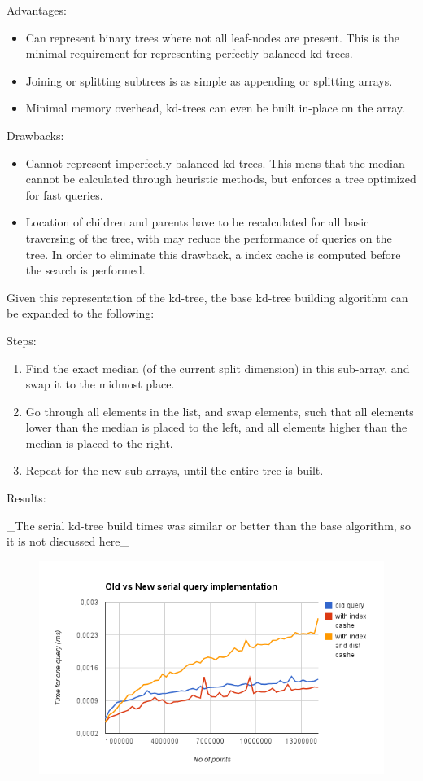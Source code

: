 \begin{enumerate}
\begin{enumerate}
Advantages:
\begin{itemize}
    \item Can represent binary trees where not all leaf-nodes are present. This is the minimal requirement for representing perfectly balanced kd-trees.
    \item Joining or splitting subtrees is as simple as appending or splitting arrays.
    \item Minimal memory overhead, kd-trees can even be built in-place on the array.
\end{itemize}

Drawbacks:
\begin{itemize}
    \item Cannot represent imperfectly balanced kd-trees. This mens that the median cannot be calculated through heuristic methods, but enforces a tree optimized for fast queries.
    \item Location of children and parents have to be recalculated for all basic traversing of the tree, with may reduce the performance of queries on the tree. In order to eliminate this drawback, a index cache is computed before the search is performed.
\end{itemize}

Given this representation of the kd-tree, the base kd-tree building algorithm can be expanded to the following:

Steps:
\begin{enumerate}
    \item Find the exact median (of the current split dimension) in this sub-array, and swap it to the midmost place.
    \item Go through all elements in the list, and swap elements, such that all elements lower than the median is placed to the left, and all elements higher than the median is placed to the right.
    \item Repeat for the new sub-arrays, until the entire tree is built.
\end{enumerate}

Results:

_The serial kd-tree build times was similar or better than the base algorithm, so it is not discussed here_

\begin{figure}[ht!]
\centering
\includegraphics[width=120mm]{gfx/awg-query-time-old-vs-new.png}


\end{figure}
\end{enumerate}
\end{enumerate}
